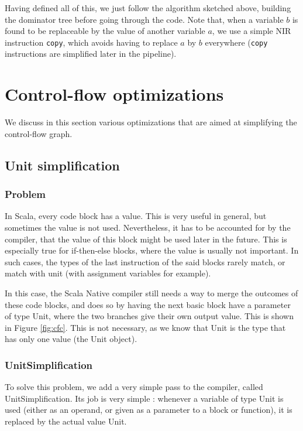 \documentclass[11pt,a4paper]{article}
\newcommand{\scala}[1]{\textsf{#1}}
\newcommand{\nir}[1]{\texttt{#1}}
\begin{document}
Having defined all of this, we just follow the algorithm sketched above, building the dominator tree before going through the code. Note that, when a variable $b$ is found to be replaceable by the value of another variable $a$, we use a simple NIR instruction \nir{copy}, which avoids having to replace $a$ by $b$ everywhere (\nir{copy} instructions are simplified later in the pipeline).

\section{Control-flow optimizations}

We discuss in this section various optimizations that are aimed at simplifying the control-flow graph.

\subsection{Unit simplification}

\subsubsection*{Problem}

In Scala, every code block has a value. This is very useful in general, but sometimes the value is not used. Nevertheless, it has to be accounted for by the compiler, that the value of this block might be used later in the future. This is especially true for if-then-else blocks, where the value is usually not important. In such cases, the types of the last instruction of the said blocks rarely match, or match with unit (with assignment variables for example).


In this case, the Scala Native compiler still needs a way to merge the outcomes of these code blocks, and does so by having the next basic block have a parameter of type \scala{Unit}, where the two branches give their own output value. This is shown in Figure \ref{fig:cfc}. This is not necessary, as we know that \scala{Unit} is the type that has only one value (the \scala{Unit} object).

\subsubsection*{UnitSimplification}

To solve this problem, we add a very simple pass to the compiler, called \scala{UnitSimplification}. Its job is very simple : whenever a variable of type \scala{Unit} is used (either as an operand, or given as a parameter to a block or function), it is replaced by the actual value \scala{Unit}.
\end{document}
